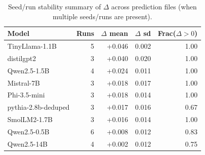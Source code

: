 \begin{table}[t]
\centering
\caption{Seed/run stability summary of $\Delta$ across prediction files (when multiple seeds/runs are present).}
\label{tab:seed_summary}
\begin{tabular}{lrrrr}
\toprule
Model & Runs & $\Delta$ mean & $\Delta$ sd & Frac($\Delta>0$) \\
\midrule
TinyLlama-1.1B & 5 & +0.046 & 0.002 & 1.00 \\
distilgpt2 & 3 & +0.040 & 0.020 & 1.00 \\
Qwen2.5-1.5B & 4 & +0.024 & 0.011 & 1.00 \\
Mistral-7B & 3 & +0.018 & 0.017 & 1.00 \\
Phi-3.5-mini & 3 & +0.018 & 0.014 & 1.00 \\
pythia-2.8b-deduped & 3 & +0.017 & 0.016 & 0.67 \\
SmolLM2-1.7B & 3 & +0.016 & 0.014 & 1.00 \\
Qwen2.5-0.5B & 6 & +0.008 & 0.012 & 0.83 \\
Qwen2.5-14B & 4 & +0.002 & 0.012 & 0.75 \\
\bottomrule
\end{tabular}
\end{table}
